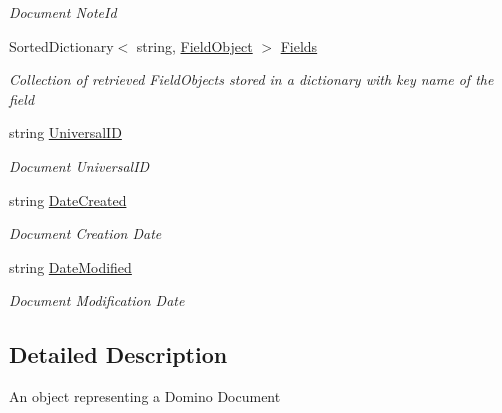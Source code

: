 \begin{DoxyCompactItemize}
\begin{DoxyCompactList}\small\item\em Document Note\+Id \end{DoxyCompactList}\item 
Sorted\+Dictionary$<$ string, \hyperlink{class_field_object}{Field\+Object} $>$ \hyperlink{class_document_object_ae203b8a3e40b6c428145d2335b71245c}{Fields}
\begin{DoxyCompactList}\small\item\em Collection of retrieved Field\+Objects stored in a dictionary with key name of the field \end{DoxyCompactList}\item 
string \hyperlink{class_document_object_a8b96d04632a2802e7cc5466ca5cee8cf}{Universal\+ID}
\begin{DoxyCompactList}\small\item\em Document Universal\+ID \end{DoxyCompactList}\item 
string \hyperlink{class_document_object_a819cb8baad094f6e5990c54ec1eee8b0}{Date\+Created}
\begin{DoxyCompactList}\small\item\em Document Creation Date \end{DoxyCompactList}\item 
string \hyperlink{class_document_object_a87ba1b3ac1b74b104972c25b245c504b}{Date\+Modified}
\begin{DoxyCompactList}\small\item\em Document Modification Date \end{DoxyCompactList}\end{DoxyCompactItemize}


\subsection{Detailed Description}
An object representing a Domino Document 

